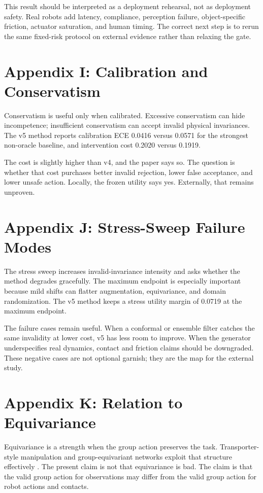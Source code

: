 \documentclass{article}
\begin{document}
This result should be interpreted as a deployment rehearsal, not as deployment safety. Real robots add latency, compliance, perception failure, object-specific friction, actuator saturation, and human timing. The correct next step is to rerun the same fixed-risk protocol on external evidence rather than relaxing the gate.


\section{Appendix I: Calibration and Conservatism}
Conservatism is useful only when calibrated. Excessive conservatism can hide incompetence; insufficient conservatism can accept invalid physical invariances. The v5 method reports calibration ECE 0.0416 versus 0.0571 for the strongest non-oracle baseline, and intervention cost 0.2020 versus 0.1919.

The cost is slightly higher than v4, and the paper says so. The question is whether that cost purchases better invalid rejection, lower false acceptance, and lower unsafe action. Locally, the frozen utility says yes. Externally, that remains unproven.


\section{Appendix J: Stress-Sweep Failure Modes}
The stress sweep increases invalid-invariance intensity and asks whether the method degrades gracefully. The maximum endpoint is especially important because mild shifts can flatter augmentation, equivariance, and domain randomization. The v5 method keeps a stress utility margin of 0.0719 at the maximum endpoint.

The failure cases remain useful. When a conformal or ensemble filter catches the same invalidity at lower cost, v5 has less room to improve. When the generator underspecifies real dynamics, contact and friction claims should be downgraded. These negative cases are not optional garnish; they are the map for the external study.


\section{Appendix K: Relation to Equivariance}
Equivariance is a strength when the group action preserves the task. Transporter-style manipulation and group-equivariant networks exploit that structure effectively \citep{angelopoulos2021conformal,brohan2022rt1,brohan2023rt2,openx2023rtx,khazatsky2024droid}. The present claim is not that equivariance is bad. The claim is that the valid group action for observations may differ from the valid group action for robot actions and contacts.
\end{document}
